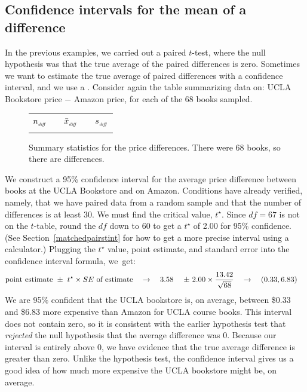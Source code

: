 \D{~}


\subsection{Confidence intervals for the mean of a difference}
\label{ciMeanOfDifferences}

In the previous examples, we carried out a paired $t$-test, where the null hypothesis was that the true average of the paired differences is zero. Sometimes we want to estimate the true average of paired differences with a confidence interval, and we use a . Consider again the table summarizing data on: UCLA Bookstore price $-$ Amazon price, for each of the 68 books sampled.

\begin{figure}[hh]
\centering
\begin{tabular}{ccccc}
\hline
$n_{_{\text{\emph{diff}}}}$	&\hspace{3mm}& $\bar{x}_{_{\text{\emph{diff}}}}$	&\hspace{3mm}& $s_{_{\text{\emph{diff}}}}$ \vspace{1mm}\\
\uclabookN{}  && \uclabookM{}  && \uclabookSD{} \\
\hline
\end{tabular}
\caption{Summary statistics for the price differences.
    There were 68 books, so there are \uclabookN{}
    differences.}
\label{textbooksSummaryStats1}
\end{figure}

We construct a 95\% confidence interval for the average price difference between books at the UCLA Bookstore and on Amazon. Conditions have already verified, namely, that we have paired data from a random sample and that the number of differences is at least 30.  We must find the critical value, $t^{\star}$. Since $df = 67$ is not on the $t$-table, round the $df$ down to 60 to get a $t^{\star}$ of 2.00 for 95\% confidence. (See Section~\ref{matchedpairstint} for how to get a more precise interval using a calculator.)  Plugging the $t^{\star}$ value, point estimate, and standard error into the confidence interval formula, we~get:
\begin{align*}
\text{point estimate} \ &\pm\ t^{\star}\times SE\ \text{of estimate}
  \quad\to\quad
      \uclabookM{} \ &\pm\ 
          2.00 \times
          \frac{\uclabookSD{}}{\sqrt{\uclabookN{}}}
  \quad\to\quad
      (0.33&,  6.83)
\end{align*}
We are 95\% confident that the UCLA bookstore is, on average, between \$0.33 and \$6.83 more expensive than Amazon for UCLA course books. This interval does not contain zero, so it is consistent with the earlier hypothesis test that \emph{rejected} the null hypothesis that the average difference was 0. Because our interval is entirely above 0, we have evidence that the true average difference is greater than zero. Unlike the hypothesis test, the confidence interval gives us a good idea of how much more expensive the UCLA bookstore might be, on average.

